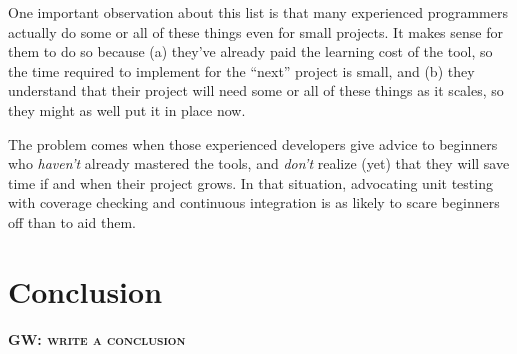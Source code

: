 \documentclass[10pt]{article}
\newcommand{\fixme}[2]{\textsc{\textbf{{#1}: {#2}}}}
\begin{document}
One important observation about this list is that many experienced
programmers actually do some or all of these things even for small
projects. It makes sense for them to do so because (a) they've already
paid the learning cost of the tool, so the time required to implement
for the ``next'' project is small, and (b) they understand that their
project will need some or all of these things as it scales, so they
might as well put it in place now.

The problem comes when those experienced developers give advice to
beginners who \emph{haven't} already mastered the tools, and
\emph{don't} realize (yet) that they will save time if and when their
project grows.  In that situation, advocating unit testing with
coverage checking and continuous integration is as likely to scare
beginners off than to aid them.

\section{Conclusion}\label{sec:conclusion}

\fixme{GW}{write a conclusion}


\end{document}
